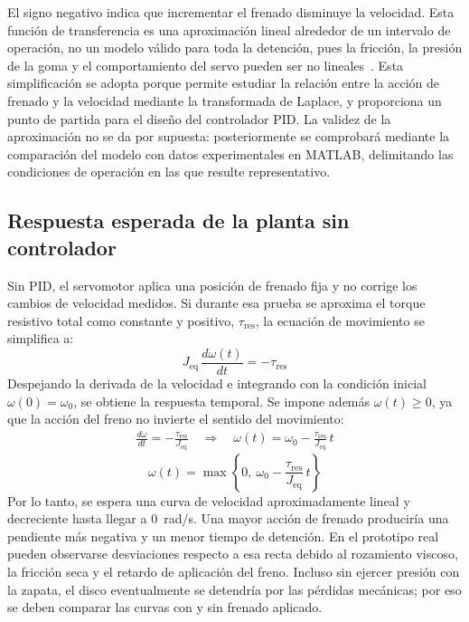 El signo negativo indica que incrementar el frenado disminuye la velocidad. Esta función de
transferencia es una aproximación lineal alrededor de un intervalo de operación, no un modelo
válido para toda la detención, pues la fricción, la presión de la goma y el comportamiento del
servo pueden ser no lineales~\cite{ctms_motor}. Esta simplificación se adopta porque permite
estudiar la relación entre la acción de frenado y la velocidad mediante la transformada de
Laplace, y proporciona un punto de partida para el diseño del controlador PID. La validez de la
aproximación no se da por supuesta: posteriormente se comprobará mediante la comparación del
modelo con datos experimentales en MATLAB, delimitando las condiciones de operación en las que
resulte representativo.

\subsection{Respuesta esperada de la planta sin controlador}
Sin PID, el servomotor aplica una posición de frenado fija y no corrige los cambios de velocidad
medidos. Si durante esa prueba se aproxima el torque resistivo total como constante y positivo,
$\tau_\text{res}$, la ecuación de movimiento se simplifica a:
\begin{equation}
  J_\text{eq}\,\frac{d\omega(t)}{dt} = -\tau_\text{res}
  \label{eq:torque_constante}
\end{equation}
Despejando la derivada de la velocidad e integrando con la condición inicial
$\omega(0)=\omega_0$, se obtiene la respuesta temporal. Se impone además $\omega(t)\geq 0$, ya
que la acción del freno no invierte el sentido del movimiento:
\begin{gather*}
  \frac{d\omega}{dt} = -\frac{\tau_\text{res}}{J_\text{eq}}
  \quad\Longrightarrow\quad
  \omega(t) = \omega_0 - \frac{\tau_\text{res}}{J_\text{eq}}\,t
\end{gather*}
\begin{equation}
  \omega(t) = \max\left\{0,\ \omega_0 - \frac{\tau_\text{res}}{J_\text{eq}}\,t\right\}
  \label{eq:respuesta_lineal}
\end{equation}
Por lo tanto, se espera una curva de velocidad aproximadamente lineal y decreciente hasta llegar a
\SI{0}{rad/s}. Una mayor acción de frenado produciría una pendiente más negativa y un menor tiempo
de detención. En el prototipo real pueden observarse desviaciones respecto a esa recta debido al
rozamiento viscoso, la fricción seca y el retardo de aplicación del freno. Incluso sin ejercer
presión con la zapata, el disco eventualmente se detendría por las pérdidas mecánicas; por eso se
deben comparar las curvas con y sin frenado aplicado.

